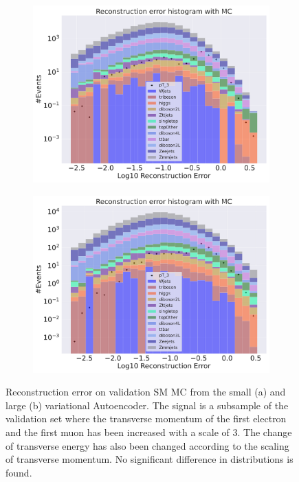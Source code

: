 \begin{figure}[H]
    \centering
    \begin{subfigure}{.45\textwidth}
        \includegraphics[width=\textwidth]{Figures/VAE_testing/small/b_data_recon_big_rm3_feats_sig_pT_3.pdf}
        \caption{ }
        \label{fig:VAE_small_pt_3}
    \end{subfigure}
    \hfill 
    \begin{subfigure}{.45\textwidth}
        \includegraphics[width=\textwidth]{Figures/VAE_testing/big/b_data_recon_big_rm3_feats_sig_pT_3.pdf}
        \caption{ }
        \label{fig:VAE_big_pt_3}
    \end{subfigure}
    \hfill 
    \caption[VAE | Reconstruction error $p_T$ altering of 3]{Reconstruction error on validation SM MC from the small (a) and large (b) variational Autoencoder. The signal is a subsample of the validation 
    set where the transverse momentum of the first electron and the first muon has been increased with a scale of $3$. The change of transverse 
    energy has also been changed according to the scaling of transverse momentum. No significant difference in distributions is found.}
    \label{fig:VAE_big_small_pt_3}
\end{figure}

